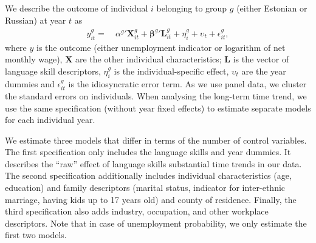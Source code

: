 \documentclass[12pt, a4paper]{article}
\renewcommand*{\vec}[1]{\boldsymbol{#1}}
\begin{document}
We describe the outcome of individual $i$ belonging to group $g$ (either Estonian
or Russian) at year $t$ as
\begin{equation}
	\label{eq:specification}
	\begin{split}                                                       
		y_{it} ^{g} = &\: \alpha^{g}{}' \vec{X}_{it}^{g} + \vec{\beta}^{g}{}' \vec{L}_{it}^{g} +
		\eta_{i}^{g} +
		\upsilon_{t} + \epsilon_{it}^{g},                                                                                                                                                          
	\end{split}
\end{equation}
where $y$ is the outcome (either unemployment indicator
or logarithm of net monthly wage), $\vec{X}$ are the other individual
characteristics; $\vec{L}$ is the vector of
language skill descriptors, $\eta_{i}^{g}$ is the individual-specific effect, $\upsilon_{t}$ are the year dummies and $\epsilon_{it}^{g}$
is the idiosyncratic error term. 
As we use panel data, we cluster the
standard errors on individuals.  When analysing the long-term time
trend, we use the same specification (without year fixed effects) to
estimate separate models for each individual year.

We estimate three models that differ in terms of the number of
control variables. The first specification only includes the language skills
and year dummies.  It describes the ``raw'' effect of language skills
substantial time trends in our data.
The second specification additionally includes individual
characteristics (age, education) and family descriptors (marital
status, indicator for inter-ethnic marriage, having kids up to 17 years
old) and county of residence.  
Finally, the third specification also adds industry, occupation, and other
workplace descriptors.
Note that in case of unemployment probability,
we only estimate the first two models.
\end{document}
